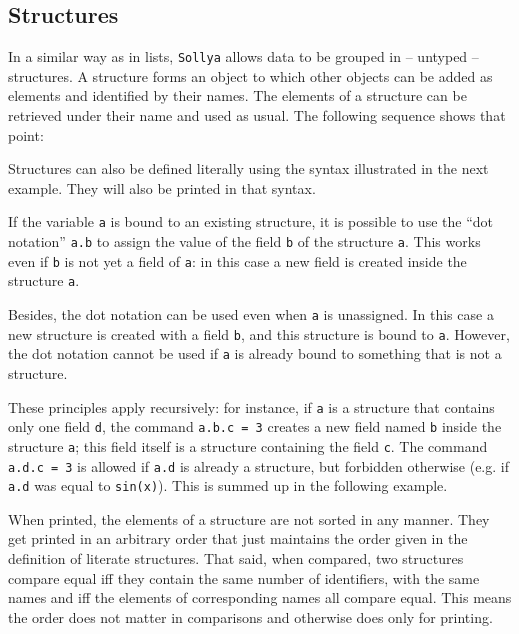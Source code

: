 \documentclass[a4paper]{article}
\newcommand{\sollya}{\texttt{Sollya}\xspace}
\begin{document}
\subsection{Structures}

In a similar way as in lists, \sollya allows data to be grouped in --
untyped -- structures. A structure forms an object to which other
objects can be added as elements and identified by their names. The
elements of a structure can be retrieved under their name and used as
usual. The following sequence shows that point:



Structures can also be defined literally using the syntax illustrated
in the next example. They will also be printed in that syntax.



If the variable \texttt{a} is bound to an existing structure, it is possible to use the ``dot notation'' \texttt{a.b} to assign the value of the field \texttt{b} of the structure \texttt{a}. This works even if \texttt{b} is not yet a field of \texttt{a}: in this case a new field is created inside the structure \texttt{a}. 

Besides, the dot notation can be used even when \texttt{a} is unassigned. In this case a new structure is created with a field \texttt{b}, and this structure is bound to \texttt{a}. However, the dot notation cannot be used if \texttt{a} is already bound to something that is not a structure.

These principles apply recursively: for instance, if \texttt{a} is a structure that contains only one field \texttt{d}, the command \texttt{a.b.c = 3} creates a new field named \texttt{b} inside the structure \texttt{a}; this field itself is a structure containing the field \texttt{c}. The command \texttt{a.d.c = 3} is allowed if \texttt{a.d} is already a structure, but forbidden otherwise (e.g. if \texttt{a.d} was equal to \texttt{sin(x)}). This is summed up in the following example.



When printed, the elements of a structure are not sorted in any
manner. They get printed in an arbitrary order that just maintains the
order given in the definition of literate structures. That said, when
compared, two structures compare equal iff they contain the same
number of identifiers, with the same names and iff the elements of
corresponding names all compare equal. This means the order does
not matter in comparisons and otherwise does only for printing.
\end{document}
